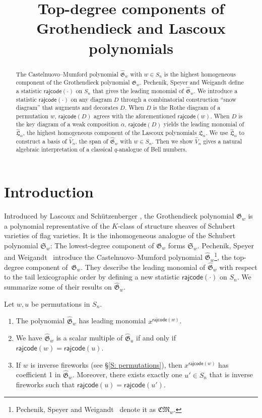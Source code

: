 \documentclass[ALCO]{cedram}
\title{Top-degree components of Grothendieck and Lascoux polynomials}
\author[\initial{J.} Pan]{\firstname{Jianping} \lastname{Pan}}
\author[\initial{T.} Yu]{\firstname{Tianyi} \lastname{Yu}}
\newcommand{\fG}{\mathfrak{G}}
\newcommand{\fGb}{\fG}
\newcommand{\topGro}{\widehat{\fG}}
\newcommand{\fS}{\mathfrak{S}}
\newcommand{\rajcode}{\mathsf{rajcode}}
\begin{document}
\begin{abstract}
The Castelnuovo--Mumford polynomial $\widehat{\mathfrak{G}}_w$ with $w \in S_n$
is the highest homogeneous component of the Grothendieck polynomial $\mathfrak{G}_w$.
Pechenik, Speyer and Weigandt define a statistic $\mathsf{rajcode}(\cdot)$ 
on $S_n$ that gives the leading monomial of $\widehat{\mathfrak{G}}_w$.
We introduce a statistic $\mathsf{rajcode}(\cdot)$ on any diagram $D$
through a combinatorial construction ``snow diagram''
that augments and decorates $D$.
When $D$ is the Rothe diagram of a permutation $w$, $\mathsf{rajcode}(D)$ 
agrees with the aforementioned $\mathsf{rajcode}(w)$.
When $D$ is the key diagram of a weak composition $\alpha$, $\mathsf{rajcode}(D)$ yields 
the leading monomial of $\widehat{\mathfrak{L}}_\alpha$, 
the highest homogeneous component of the Lascoux polynomials $\mathfrak{L}_\alpha$.
We use $\widehat{\mathfrak{L}}_\alpha$ to construct a basis of $\widehat{V}_n$, the span of 
$\widehat{\mathfrak{G}}_w$ with $w \in S_n$.
Then we show $\widehat{V}_n$ gives a natural algebraic 
interpretation of a classical $q$-analogue of Bell numbers.
\end{abstract}


\maketitle

\section{Introduction}\label{S: Intro}

Introduced by Lascoux and Sch\"utzenberger \cite{LS:Groth},
the Grothendieck polynomial $\fGb_w$
is a polynomial representative of the 
$K$-class of structure sheaves of 
Schubert varieties of flag varieties.
It is the inhomogeneous analogue
of the Schubert polynomial $\fS_w$: 
The lowest-degree component
of $\fG_w$ forms $\fS_w$.
Pechenik, Speyer and Weigandt~\cite{PSW} introduce the
Castelnuovo--Mumford polynomial $\topGro_w$\footnote{Pechenik, Speyer and Weigandt~\cite{PSW} denote it as $\mathfrak{CM}_w$.}, 
the top-degree component of~$\fG_w$.
They describe the leading monomial of $\topGro_w$
with respect to the tail lexicographic order
by defining a new statistic 
$\rajcode(\cdot)$ on $S_n$.
We summarize some of their results on $\topGro_w$.

\begin{ourthm}
\label{thm:psw}
Let $w,u$ be permutations in $S_n$.
\begin{enumerate}
\item[(A)]
The polynomial $\topGro_w$ has leading monomial $x^{\rajcode(w)}$.
\item[(B)] 
We have
$\topGro_w$ is a scalar multiple of $\topGro_{u}$
if and only if $\rajcode(w) = \rajcode(u)$.
\item[(C)] 
If $w$ is inverse fireworks 
(see \S\ref{S: permutations}), 
then $x^{\rajcode(w)}$ has 
coefficient 1 in $\topGro_w$.
Moreover, there exists
exactly one $u'\in S_n$ that is inverse fireworks
such that $\rajcode(u) = \rajcode(u')$.
\end{enumerate}
\end{ourthm}
\end{document}
